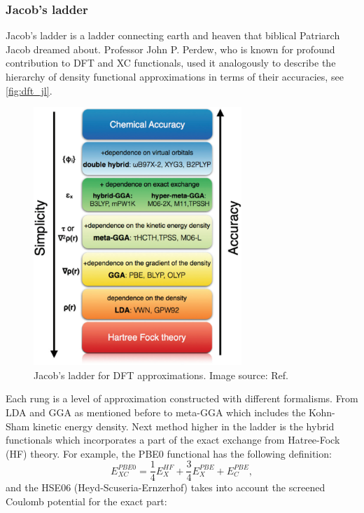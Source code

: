 \subsubsection{Jacob's ladder}
Jacob's ladder is a ladder connecting earth and heaven that biblical Patriarch Jacob dreamed about. Professor John P. Perdew, who is known for profound contribution to DFT and XC functionals, used it analogously to describe the hierarchy of density functional approximations in terms of their accuracies, see \autoref{fig:dft_jl}.  
\begin{figure}[htb] 
\centering  
\includegraphics[width=0.7\textwidth]{jacobs.png}
\caption[Jacob's ladder for DFT approximations]{ Jacob's ladder for DFT approximations. Image source: Ref. \cite{Peng2016}}  
\label{fig:dft_jl}
\end{figure} 
Each rung is a level of approximation constructed with different formalisms. From LDA and GGA as mentioned before to meta-GGA which includes the Kohn-Sham kinetic energy density. Next method higher in the ladder is the hybrid functionals which incorporates a part of the exact exchange from Hatree-Fock (HF) theory. For example, the PBE0 functional\cite{Carlo1999} has the following definition:
\begin{equation}
E_{XC}^{PBE0}=\frac{1}{4}E_X^{HF}+\frac{3}{4}E_X^{PBE}+E_C^{PBE},
\end{equation}
and the HSE06 (Heyd-Scuseria-Ernzerhof)\cite{Jochen2003} takes into account the screened Coulomb potential for the exact part:
